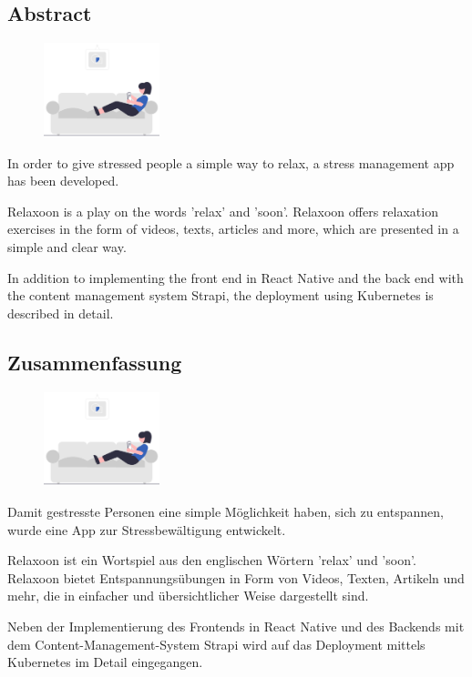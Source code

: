 \begin{spacing}{1}
    \chapter*{Abstract}
\end{spacing}
\begin{figure}
    \begin{center}
      \includegraphics[width=0.3\textwidth]{pics/undraw_Relaxing_at_home_re_mror.png}
    \end{center}
\end{figure}
In order to give stressed people a simple way to relax, a stress management app has been developed.

Relaxoon is a play on the words 'relax' and 'soon'. Relaxoon offers relaxation exercises in the form of videos, 
texts, articles and more, which are presented in a simple and clear way.

In addition to implementing the front end in React Native and the back end with the content management system
Strapi, the deployment using Kubernetes is described in detail.
\newpage
\begin{spacing}{1}
    \chapter*{Zusammenfassung}
\end{spacing}
\begin{figure}
    \begin{center}
      \includegraphics[width=0.3\textwidth]{pics/undraw_Relaxing_at_home_re_mror.png}
    \end{center}
\end{figure}
Damit gestresste Personen eine simple Möglichkeit haben, sich zu entspannen, wurde eine App zur Stressbewältigung
entwickelt. 

Relaxoon ist ein Wortspiel aus den englischen Wörtern 'relax' und 'soon'. Relaxoon bietet Entspannungsübungen 
in Form von Videos, Texten, Artikeln und mehr, die in einfacher und übersichtlicher Weise dargestellt sind.

Neben der Implementierung des Frontends in React Native und des Backends mit dem Content-Management-System
Strapi wird auf das Deployment mittels Kubernetes im Detail eingegangen.

